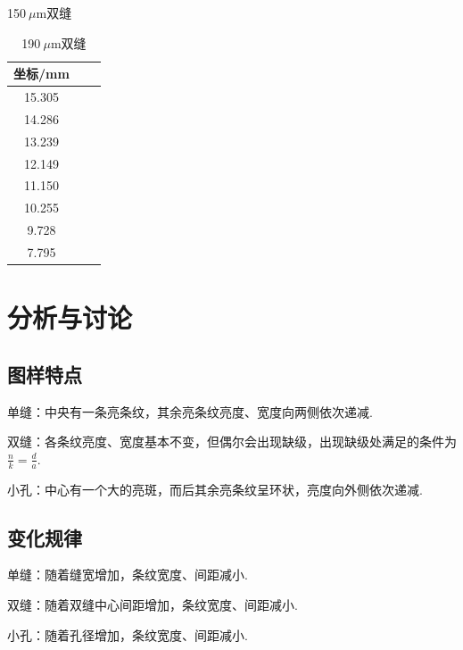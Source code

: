 \documentclass[a4paper]{article}%
\begin{document}
\begin{table}[H]
\begin{minipage}{0.13\linewidth}
        \caption{150$~\mu$m双缝}
    \end{minipage}
    \begin{minipage}{0.13\linewidth}  
        \centering
        \begin{tabular}{ccc} 
            \toprule
            坐标/mm\\
            \midrule
            15.305\\
            14.286\\
            13.239\\
            12.149\\
            11.150\\
            10.255\\
            9.728\\
            7.795\\
            \bottomrule
        \end{tabular}
        \caption{190$~\mu$m双缝}\label{2}
    \end{minipage}
\end{table}

\section{分析与讨论}
\subsection{图样特点}
单缝：中央有一条亮条纹，其余亮条纹亮度、宽度向两侧依次递减.

双缝：各条纹亮度、宽度基本不变，但偶尔会出现缺级，出现缺级处满足的条件为$\frac{n}{k}=\frac{d}{a}$.

小孔：中心有一个大的亮斑，而后其余亮条纹呈环状，亮度向外侧依次递减.

\subsection{变化规律}
单缝：随着缝宽增加，条纹宽度、间距减小.

双缝：随着双缝中心间距增加，条纹宽度、间距减小.

小孔：随着孔径增加，条纹宽度、间距减小.
\end{document}
